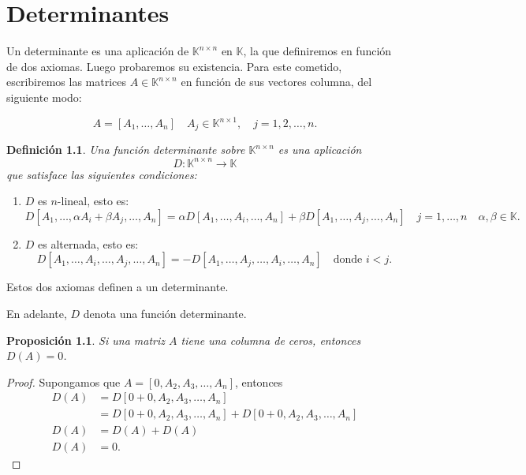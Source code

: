 \documentclass[b5paper, 11pt]{book}
\newcommand{\0}{\mathbf{0}}
\theoremstyle{estiloB}
\theoremstyle{estiloC}
\theoremstyle{estiloD}
\newtheorem{definition}{Definición}[section]
\newtheorem{proposition}{Proposición}[section]
\begin{document}
\chapter{Determinantes}

Un determinante es una aplicación de $\mathbb{K}^{n\times n}$ en $\mathbb{K}$, la que definiremos en función de dos axiomas. Luego probaremos su existencia. Para este cometido, escribiremos las matrices $A\in\mathbb{K}^{n\times n}$ en función de sus vectores columna, del siguiente modo:

\begin{equation*}
A=\left[A_1,\ldots,A_n\right]\quad A_{j}\in\mathbb{K}^{n\times1},\quad j=1,2,\ldots,n.
\end{equation*}

\begin{definition}
	Una función determinante sobre $\mathbb{K}^{n\times n}$ es una aplicación \[ D\colon\mathbb{K}^{n\times n}\longrightarrow\mathbb{K} \] que satisface las siguientes condiciones:
\end{definition}
\begin{enumerate}[1)~]
	\item $D$ es $n$-lineal, esto es: \[ D\left[A_{1},\ldots,\alpha A_{i}+\beta A_{j},\ldots, A_{n}\right]=\alpha D\left[A_{1},\ldots,A_{i},\ldots,A_{n}\right]+\beta D\left[A_{1},\ldots,A_{j},\ldots,A_{n}\right]\quad j=1,\ldots, n\quad\alpha,\beta\in\mathbb{K}. \]
	\item $D$ es alternada, esto es: \[ D\left[A_{1},\ldots,A_{i},\ldots,A_{j},\ldots,A_{n}\right]=-D\left[A_{1},\ldots,A_{j},\ldots,A_{i},\ldots,A_{n}\right]\quad\text{donde }i<j. \]
\end{enumerate}
Estos dos axiomas definen a un determinante.

En adelante, $D$ denota una función determinante.

\begin{proposition}\label{prop:1}
	Si una matriz $A$ tiene una columna de ceros, entonces $D\left(A\right)=0$.
\end{proposition}
\begin{proof}
	Supongamos que $A=\left[0,A_{2},A_{3},\ldots,A_{n}\right]$, entonces
	\begin{align*}
	D\left(A\right)	&= D\left[0+0,A_{2},A_{3},\ldots, A_{n}\right]\\
	&= D\left[0+0,A_{2},A_{3},\ldots, A_{n}\right]+D\left[0+0,A_{2},A_{3},\ldots, A_{n}\right]\\
	D\left(A\right)	&= D\left(A\right)+D\left(A\right)\\
	D\left(A\right)	&= 0.
	\end{align*}
\end{proof}
\end{document}
